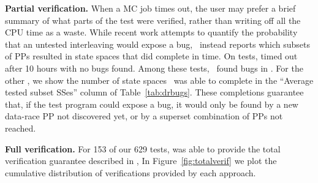 {\bf Partial verification.}
When a MC job times out, the user may prefer a brief summary of what parts of the test were verified, rather than writing off all the CPU time as a waste.
While recent work \cite{randomized-scheduler} attempts to quantify the probability
that an untested interleaving would expose a bug,
\quicksand~instead reports which subsets of PPs resulted in state spaces that did complete in time.
On  tests,  timed out after 10 hours with no bugs found.
Among these tests, \quicksand~found bugs in .
For the other , we show the number of state spaces \quicksand~was able to complete in the ``Average tested subset SSes'' column of Table~\ref{tab:drbugs}.
These completions guarantee that, if the test program could expose a bug,
it would only be found by a new data-race PP not discovered yet, or by a superset combination of PPs not reached.

%

{\bf Full verification.}
For 153 of our 629 tests,  was able to provide the total verification guarantee described in \sect{\ref{sec:totalverif}},
In Figure~\ref{fig:totalverif} we plot the cumulative distribution of
verifications provided by each approach.

